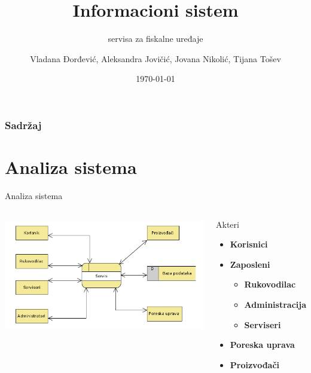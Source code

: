 \documentclass[9pt]{beamer}
\title{Informacioni sistem}
\subtitle{servisa za fiskalne uređaje}
\author{Vladana Đorđević, Aleksandra Jovičić, Jovana Nikolić, Tijana Tošev}
\institute{Matematički fakultet, Beograd}
\date{\today}
\begin{document}
\titlepage

\begin{frame}
 \frametitle{Sadržaj}
 \tableofcontents
\end{frame}

\section{Analiza sistema}
\begin{frame}{Analiza sistema}
    \begin{columns}
            \begin{center}
                \includegraphics[width=\textwidth, height=5cm]{assets/DijagramKonteksta.png}    
            \end{center}
        \begin{alertblock}{Akteri}
        	\begin{itemize}
        		\item \textbf{Korisnici}
        		\item \textbf{Zaposleni}
        		    \begin{itemize}
        		        \item \textbf{Rukovodilac}
            		    \item \textbf{Administracija}
            		    \item \textbf{Serviseri}
        	        \end{itemize}
        	    \item \textbf{Poreska uprava}
        	    \item \textbf{Proizvođači}
        	\end{itemize}
    	\end{alertblock}
    \end{columns}
\end{frame}
\end{document}
